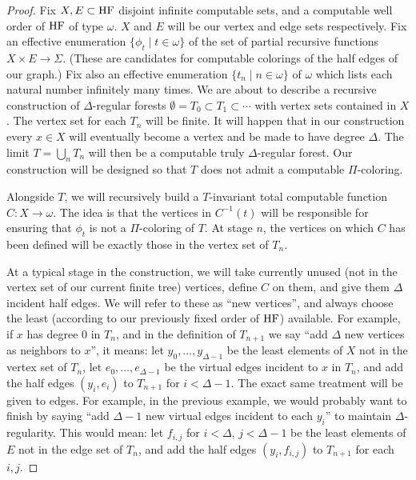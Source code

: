 \documentclass[11pt]{amsart}
\theoremstyle{definition}
\newcommand{\HF}{\textnormal{HF}}
\newcommand{\inv}{^{-1}}
\begin{document}
\begin{proof}
Fix $X,E \subset \HF$ disjoint infinite computable sets, and a computable well order of $\HF$ of type $\omega$. $X$ and $E$ will be our vertex and edge sets respectively. Fix an effective enumeration $\{\phi_t \mid t \in \omega \}$ of the set of partial recursive functions $X \times E \rightarrow \Sigma$. (These are candidates for computable colorings of the half edges of our graph.) Fix also an effective enumeration $\{t_n \mid n \in \omega \}$ of $\omega$ which lists each natural number infinitely many times. We are about to describe a recursive construction of $\Delta$-regular forests $\emptyset = T_0 \subset T_1 \subset \cdots$ with vertex sets contained in $X$. The vertex set for each $T_n$ will be finite. It will happen that in our construction every $x \in X$ will eventually become a vertex and be made to have degree $\Delta$. The limit $T = \bigcup_n T_n$ will then be a computable truly $\Delta$-regular forest. Our construction will be designed so that $T$ does not admit a computable $\Pi$-coloring.

Alongside $T$, we will recursively build a $T$-invariant total computable function $C:X \rightarrow \omega$. The idea is that the vertices in $C\inv(t)$ will be responsible for ensuring that $\phi_t$ is not a $\Pi$-coloring of $T$. At stage $n$, the vertices on which $C$ has been defined will be exactly those in the vertex set of $T_n$. 

At a typical stage in the construction, we will take currently unused (not in the vertex set of our current finite tree) vertices, define $C$ on them, and give them $\Delta$ incident half edges. We will refer to these as ``new vertices'', and always choose the least (according to our previously fixed order of $\HF$) available. For example, if $x$ has degree 0 in $T_n$, and in the definition of $T_{n+1}$ we say ``add $\Delta$ new vertices as neighbors to $x$'', it means: let $y_0,\ldots,y_{\Delta-1}$ be the least elements of $X$ not in the vertex set of $T_n$, let $e_0,\ldots,e_{\Delta-1}$ be the virtual edges incident to $x$ in $T_n$, and add the half edges $(y_i,e_i)$ to $T_{n+1}$ for $i < \Delta-1$. The exact same treatment will be given to edges. For example, in the previous example, we would probably want to finish by saying ``add $\Delta-1$ new virtual edges incident to each $y_i$'' to maintain $\Delta$-regularity. This would mean: let $f_{i,j}$ for $i < \Delta$, $j < \Delta - 1$ be the least elements of $E$ not in the edge set of $T_n$, and add the half edges $(y_i,f_{i,j})$ to $T_{n+1}$ for each $i,j$. 


\end{proof}
\end{document}
